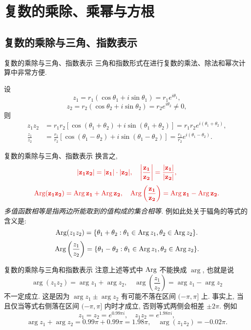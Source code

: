 \section{复数的乘除、乘幂与方根}

\subsection{复数的乘除与三角、指数表示}
\begin{frame}{复数的乘除与三角、指数表示}
	\onslide<+->
	三角和指数形式在进行复数的乘法、除法和幂次计算中非常方便.

	\onslide<+->
	\begin{theorem}
		设
		\[z_1=r_1(\cos\theta_1+i\sin\theta_1)=r_1e^{i\theta_1},\]
		\[z_2=r_2(\cos\theta_2+i\sin\theta_2)=r_2e^{i\theta_2}\neq 0,\]
		则
		\begin{align*}
			z_1z_2&=r_1r_2[\cos(\theta_1+\theta_2)+i\sin(\theta_1+\theta_2)]=r_1r_2e^{i(\theta_1+\theta_2)},\\
			\frac{z_1}{z_2}&=\frac{r_1}{r_2}[\cos(\theta_1-\theta_2)+i\sin(\theta_1-\theta_2)]=\frac{r_1}{r_2}e^{i(\theta_1-\theta_2)}.
		\end{align*}
	\end{theorem}
\end{frame}


\begin{frame}{复数的乘除与三角、指数表示}
	\onslide<+->
	换言之,
	\[\alert{|z_1z_2|=|z_1|\cdot|z_2|,\quad\abs{\frac{z_1}{z_2}}=\frac{|z_1|}{|z_2|},}\]
	\onslide<+->
	\[\alert{\Arg(z_1z_2)=\Arg z_1+\Arg z_2,\quad
	\Arg\left(\frac{z_1}{z_2}\right)=\Arg z_1-\Arg z_2.}\]
	\onslide<+->
	\emph{多值函数相等是指两边所能取到的值构成的集合相等.}
	\onslide<+->
	例如此处关于辐角的等式的含义是:
	\[\operatorname{Arg}(z_1z_2)={\left\{\theta_1+\theta_2:\theta_1\in\operatorname{Arg} z_1,\theta_2\in\operatorname{Arg} z_2\right\}}.\]
	\[\operatorname{Arg}\left(\frac{z_1}{z_2}\right)={\left\{\theta_1-\theta_2:\theta_1\in\operatorname{Arg} z_1,\theta_2\in\operatorname{Arg} z_2\right\}}.\]
\end{frame}


\begin{frame}{复数的乘除与三角和指数表示}
	\onslide<+->
	注意上述等式中 $\operatorname{Arg}$ 不能换成 $\arg$, 也就是说
	\[\arg(z_1z_2)=\arg z_1+\arg z_2,\quad
	\arg\left(\frac{z_1}{z_2}\right)=\arg z_1-\arg z_2\]
	\alert{不一定成立}.
	\onslide<+->
	这是因为 $\arg z_1\pm\arg z_2$ 有可能不落在区间 $(-\pi,\pi]$ 上.
	\onslide<+->
	事实上, 当且仅当等式右侧落在区间 $(-\pi,\pi]$ 内时才成立, 否则等式两侧会相差 $\pm2\pi$.
	\onslide<+->
	例如
	\[z_1=z_2=e^{0.99\pi i},\quad z_1z_2=e^{1.98\pi i},\]
	\vspace{-\baselineskip}
	\onslide<+->
	\[\arg z_1+\arg z_2=0.99\pi+0.99\pi=1.98\pi,\quad
	\arg(z_1z_2)=-0.02\pi.\]
\end{frame}


